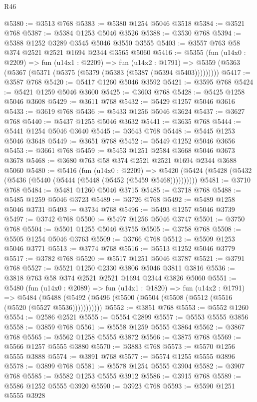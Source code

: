 \begin{lexlean}{R46}
\begin{coremodule}
@5380 := @3513 @768
@5383 := @5380 @1254 @5046 @3518
@5384 := @3521 @768
@5387 := @5384 @1253 @5046 @3526
@5388 := @3530 @768
@5394 := @5388 @1252 @3289 @3545 @5046 @3550 @3555
@5403 := @3557 @763 @58 @374 @2521 @2521 @1694 @2344 @3565 @5060
@5416 := @5355
    (fun (u14x0 : @2209) =>
    fun (u14x1 : @2209) =>
    fun (u14x2 : @1791) =>
    @5359 (@5363 (@5367 (@5371 (@5375 (@5379 (@5383 (@5387 (@5394 @5403)))))))))
@5417 := @3587 @768
@5420 := @5417 @1260 @5046 @3592
@5421 := @3595 @768
@5424 := @5421 @1259 @5046 @3600
@5425 := @3603 @768
@5428 := @5425 @1258 @5046 @3608
@5429 := @3611 @768
@5432 := @5429 @1257 @5046 @3616
@5433 := @3619 @768
@5436 := @5433 @1256 @5046 @3624
@5437 := @3627 @768
@5440 := @5437 @1255 @5046 @3632
@5441 := @3635 @768
@5444 := @5441 @1254 @5046 @3640
@5445 := @3643 @768
@5448 := @5445 @1253 @5046 @3648
@5449 := @3651 @768
@5452 := @5449 @1252 @5046 @3656
@5453 := @3661 @768
@5459 := @5453 @1251 @2584 @3668 @5046 @3673 @3678
@5468 := @3680 @763 @58 @374 @2521 @2521 @1694 @2344 @3688 @5060
@5480 := @5416
    (fun (u14x0 : @2209) =>
    @5420 (@5424 (@5428 (@5432 (@5436 (@5440 (@5444 (@5448 (@5452 (@5459 @5468))))))))))
@5481 := @3710 @768
@5484 := @5481 @1260 @5046 @3715
@5485 := @3718 @768
@5488 := @5485 @1259 @5046 @3723
@5489 := @3726 @768
@5492 := @5489 @1258 @5046 @3731
@5493 := @3734 @768
@5496 := @5493 @1257 @5046 @3739
@5497 := @3742 @768
@5500 := @5497 @1256 @5046 @3747
@5501 := @3750 @768
@5504 := @5501 @1255 @5046 @3755
@5505 := @3758 @768
@5508 := @5505 @1254 @5046 @3763
@5509 := @3766 @768
@5512 := @5509 @1253 @5046 @3771
@5513 := @3774 @768
@5516 := @5513 @1252 @5046 @3779
@5517 := @3782 @768
@5520 := @5517 @1251 @5046 @3787
@5521 := @3791 @768
@5527 := @5521 @1250 @2330 @3806 @5046 @3811 @3816
@5536 := @3818 @763 @58 @374 @2521 @2521 @1694 @2344 @3826 @5060
@5551 := @5480
    (fun (u14x0 : @2089) =>
    fun (u14x1 : @1820) =>
    fun (u14x2 : @1791) =>
    @5484 (@5488 (@5492 (@5496 (@5500 (@5504 (@5508 (@5512 (@5516 (@5520 (@5527 @5536)))))))))))
@5552 := @3851 @768
@5553 := @5552 @1260
@5554 := @2586 @2521
@5555 := @5554 @2899
@5557 := @5553 @5555 @3856
@5558 := @3859 @768
@5561 := @5558 @1259 @5555 @3864
@5562 := @3867 @768
@5565 := @5562 @1258 @5555 @3872
@5566 := @3875 @768
@5569 := @5566 @1257 @5555 @3880
@5570 := @3883 @768
@5573 := @5570 @1256 @5555 @3888
@5574 := @3891 @768
@5577 := @5574 @1255 @5555 @3896
@5578 := @3899 @768
@5581 := @5578 @1254 @5555 @3904
@5582 := @3907 @768
@5585 := @5582 @1253 @5555 @3912
@5586 := @3915 @768
@5589 := @5586 @1252 @5555 @3920
@5590 := @3923 @768
@5593 := @5590 @1251 @5555 @3928

\end{coremodule}
\end{lexlean}
